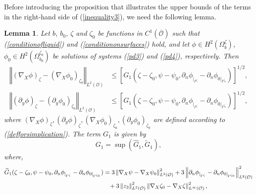 \documentclass[11pt]{article}
\newtheorem{lemma}[theorem]{Lemma}
\begin{document}
Before introducing the proposition that illustrates the upper bounds of the terms in the right-hand side of (\ref{inequality3}), we need the following lemma.
\begin{lemma}\label{uppergradfortheupper}
	Let $b$, $b_0$, $\zeta$ and $\zeta_0$ be functions in $C^1\left(\overline{\mathcal O}\right)$ such that (\ref{conditionofliquid}) and (\ref{conditiononsurfaces}) hold, and  let $\phi\in H^2(\Omega^{\zeta}_{b})$, $\phi_0\in H^2(\Omega^{\zeta_0}_{b_0})$ be solutions of systems (\ref{pd3}) and (\ref{pd4}), respectively. Then
	\begin{equation}\label{relationbetweengradandourmesurement}
		\begin{split}
			\left\Vert (\nabla_X\phi )_{\zeta}-(\nabla_X\phi_0)_{\zeta_0}  \right\Vert_{L^2( \mathcal O )}&\leq \left[G_1\left(\zeta-\zeta_0,\psi-\psi_0,\partial_n\phi_{|_{\Gamma^{\zeta}}}-\partial_n\phi_{0|_{\Gamma^{\zeta_0}}}\right)\right]^{1/2},\\
			\left\Vert (\partial_y\phi ) _{\zeta}- (\partial_y\phi_0)_{ \zeta_0}  \right\Vert_{L^2(\mathcal O )}&\leq \left[G_1\left(\zeta-\zeta_0,\psi-\psi_0,\partial_n\phi_{|_{\Gamma^{\zeta}}}-\partial_n\phi_{0|_{\Gamma^{\zeta_0}}}\right)\right]^{1/2},
		\end{split}
	\end{equation}
	where $(\nabla_X\phi )_{\zeta},  (\partial _y\phi )_{\zeta}, (\nabla_X\phi _0)_{\zeta _0}, 
	(\partial _y\phi_0 )_{\zeta_0}$ are defined according to (\ref{defforsimplication}). The term $G_1$  is given by
	  \begin{equation}\label{firstmajG1}
	  	G_1=\sup(\widehat{G}_1,\widetilde{G}_1),
	  \end{equation} 
	  where, 
	\begin{equation}\label{firstmajG11}
		\begin{split}
			\widehat{G}_1(\zeta-\zeta_0, \psi-\psi_0 ,\partial_n\phi_{|_{\Gamma^{\zeta  }     }}-\partial_n\phi_{0|_{\Gamma^{\zeta_0    }   }} )&= 3\left\Vert \nabla_X\psi-\nabla_X\psi_0  \right\Vert_{L^{2}(\mathcal O )}^2+3\left\Vert  \partial_n\phi_{|_{\Gamma^{\zeta   }    }}-\partial_n\phi_{0|_{\Gamma^{\zeta_0 }      }}\right\Vert_{L^{2}(\mathcal O )}^2\\
		&\hspace{0.3cm}+ 3\left\Vert z_3 \right\Vert_{L^{2}(\mathcal O )}^2 \left\Vert \nabla_X\zeta_0-\nabla_X\zeta   \right\Vert_{L^{\infty}(\mathcal O )}^2,\\
		\end{split}
	\end{equation} 

\end{lemma}
\end{document}
